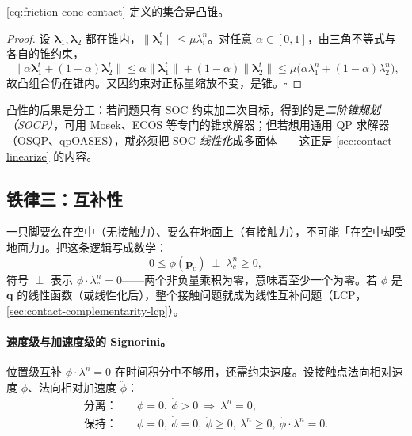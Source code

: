 \begin{proposition}[摩擦锥的凸性]
\label{prop:cone-convex}
\cref{eq:friction-cone-contact} 定义的集合是凸锥。
\end{proposition}
\begin{proof}
设 $\boldsymbol{\lambda}_1,\boldsymbol{\lambda}_2$ 都在锥内，$\|\boldsymbol{\lambda}_i^t\|\le\mu\lambda_i^n$。对任意 $\alpha\in[0,1]$，由三角不等式与各自的锥约束，
\[
\|\alpha\boldsymbol{\lambda}_1^t+(1-\alpha)\boldsymbol{\lambda}_2^t\|\le\alpha\|\boldsymbol{\lambda}_1^t\|+(1-\alpha)\|\boldsymbol{\lambda}_2^t\|\le\mu\big(\alpha\lambda_1^n+(1-\alpha)\lambda_2^n\big),
\]
故凸组合仍在锥内。又因约束对正标量缩放不变，是锥。$\square$
\end{proof}

\noindent 凸性的后果是分工：若问题只有 SOC 约束加二次目标，得到的是\emph{二阶锥规划（SOCP）}，可用 Mosek、ECOS 等专门的锥求解器；但若想用通用 QP 求解器（OSQP、qpOASES），就必须把 SOC \emph{线性化}成多面体——这正是 \cref{sec:contact-linearize} 的内容。

\subsection{铁律三：互补性}
\label{subsec:complementarity}

一只脚要么在空中（无接触力）、要么在地面上（有接触力），不可能「在空中却受地面力」。把这条逻辑写成数学：
\begin{equation}
  0\le\phi(\boldsymbol{p}_c)\ \perp\ \lambda_c^n\ge0,
  \label{eq:complementarity}
\end{equation}
符号 $\perp$ 表示 $\phi\cdot\lambda_c^n=0$——两个非负量乘积为零，意味着至少一个为零。若 $\phi$ 是 $\boldsymbol{q}$ 的线性函数（或线性化后），整个接触问题就成为线性互补问题（LCP，\cref{sec:contact-complementarity-lcp}）。

\paragraph{速度级与加速度级的 Signorini。}
位置级互补 $\phi\cdot\lambda^n=0$ 在时间积分中不够用，还需约束速度。设接触点法向相对速度 $\dot\phi$、法向相对加速度 $\ddot\phi$：
\begin{align}
  \text{分离：}\quad &\phi=0,\ \dot\phi>0\ \Rightarrow\ \lambda^n=0,\\
  \text{保持：}\quad &\phi=0,\ \dot\phi=0,\ \ddot\phi\ge0,\ \lambda^n\ge0,\ \ddot\phi\cdot\lambda^n=0.
  \label{eq:signorini-accel}
\end{align}

